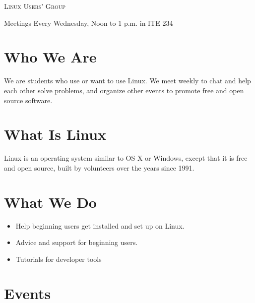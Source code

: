\documentclass[11pt]{article}
\begin{document}
\begin{multicols*}{2}

\begin{center} \scshape \Huge
    \phantom{x}
    Linux Users' Group
\end{center}

\begin{center} \Large
    Meetings
    Every Wednesday, Noon to 1 p.m. in ITE 234
\end{center}

\section*{Who We Are}

We are students who use or want to use Linux. We meet weekly to chat and help
each other solve problems, and organize other events to promote free and open
source software.

\section*{What Is Linux}

Linux is an operating system similar to OS X or Windows, except that it is free
and open source, built by volunteers over the years since 1991.


\section*{What We Do}


\begin{itemize} \large
\item Help beginning users get installed and set up on Linux.
\item Advice and support for beginning users.
\item Tutorials for developer tools
\end{itemize}

\section*{Events}


\end{multicols*}
\end{document}
